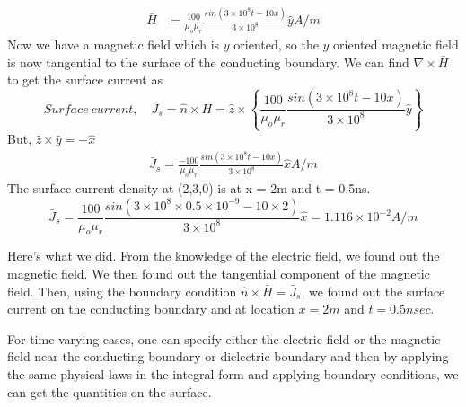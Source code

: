 \begin{exmp}
\begin{align*}
\bar{H} &= \frac{100}{\mu_o\mu_r}\frac{sin(3\times 10^8t -10x)}{3\times 10^8}\hat{y} A/m
\end{align*}
Now we have a magnetic field which is $y$ oriented, so the $y$ oriented magnetic field is now tangential to the surface of the conducting boundary. We can find $\nabla\times\bar{H}$ to get the surface current as
\begin{dmath*}
Surface\ current,\quad \bar{J}_s = \hat{n}\times\bar{H} = \hat{z}\times \left\lbrace \frac{100}{\mu_o\mu_r}\frac{sin(3\times 10^8t -10x)}{3\times 10^8}\hat{y} \right\rbrace  
\end{dmath*}
But, $\hat{z}\times\hat{y} = -\hat{x}$
\begin{align*}
\bar{J}_s = \frac{-100}{\mu_o\mu_r}\frac{sin(3\times 10^8t -10x)}{3\times 10^8}\hat{x} A/m
\end{align*}
The surface current density at (2,3,0) is at x = 2m and t = 0.5ns.
\begin{dmath*}
\bar{J}_s = \frac{100}{\mu_o\mu_r}\frac{sin(3\times 10^8\times 0.5 \times 10^{-9} - 10\times 2)}{3\times 10^8}\hat{x} = 1.116\times 10^{-2} A/m
\end{dmath*}
\end{exmp} 
Here's what we did. From the knowledge of the electric field, we found out the magnetic field. We then found out the tangential component of the magnetic field. Then, using the boundary condition $\hat{n}\times\bar{H} = \bar{J}_s$, we found out the surface current on the conducting boundary and at location $x = 2m$ and $t = 0.5nsec$.

For time-varying cases, one can specify either the electric field or the magnetic field near the conducting boundary or dielectric boundary and then by applying the same physical laws in the integral form and applying boundary conditions, we can get the quantities on the surface.

